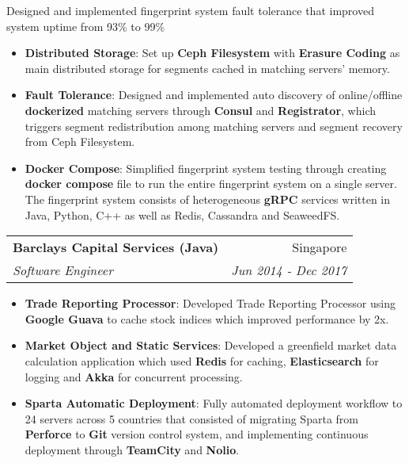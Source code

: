 \documentclass[letterpaper,11pt]{article}
\makeatletter
\newcommand{\resumeItem}[2]{
  \item\small{
    \textbf{#1}{: #2 \vspace{-2pt}}
  }
}
\newcommand{\resumeSubheading}[4]{
  \vspace{-1pt}\item
    \begin{tabular*}{0.97\textwidth}[t]{l@{\extracolsep{\fill}}r}
      \textbf{#1} & #2 \\
      \textit{\small#3} & \textit{\small #4} \\
    \end{tabular*}\vspace{-5pt}
}
\newcommand{\resumeItemListStart}{\begin{itemize}}
\newcommand{\resumeItemListEnd}{\end{itemize}\vspace{-6pt}}
\makeatother
\begin{document}
      \vspace{2pt}
      
      \small{Designed and implemented fingerprint system fault tolerance that improved system uptime from 93\% to 99\%}
      
      \vspace{-8pt}
            
      \resumeItemListStart
      
        \resumeItem{Distributed Storage}
          {Set up \textbf{Ceph Filesystem} with \textbf{Erasure Coding} as main distributed storage for segments cached in matching servers' memory.}
      
        \resumeItem{Fault Tolerance}
          {Designed and implemented auto discovery of online/offline \textbf{dockerized} matching servers through \textbf{Consul} and \textbf{Registrator}, which triggers segment redistribution among matching servers and segment recovery from Ceph Filesystem.}
                
        \resumeItem{Docker Compose}
          {Simplified fingerprint system testing through creating \textbf{docker compose} file to run the entire fingerprint system on a single server. The fingerprint system consists of heterogeneous \textbf{gRPC} services written in Java, Python, C++ as well as Redis, Cassandra and SeaweedFS.}
        
      \resumeItemListEnd
      
    \resumeSubheading
      {Barclays Capital Services (Java)}{Singapore}
      {Software Engineer}{Jun 2014 - Dec 2017}
      \resumeItemListStart
        \resumeItem{Trade Reporting Processor}
          {Developed Trade Reporting Processor using \textbf{Google Guava} to cache stock indices which improved performance by 2x.}
          
        \resumeItem{Market Object and Static Services}
          {Developed a greenfield market data calculation application which used \textbf{Redis} for caching, \textbf{Elasticsearch} for logging and \textbf{Akka} for concurrent processing.}
          
        \resumeItem{Sparta Automatic Deployment}
          {Fully automated deployment workflow to 24 servers across 5 countries that consisted of migrating Sparta from \textbf{Perforce} to \textbf{Git} version control system, and implementing continuous deployment through \textbf{TeamCity} and \textbf{Nolio}.}

      \resumeItemListEnd
      
\end{document}
